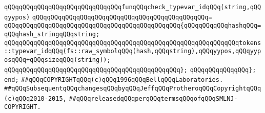 \newline
\verb|qQQqqQQqqQQqqQQqqQQqqQQqqQQqqQQqfunqQQqcheck_typevar_idqQQq(string,qQQqyypos)|\newline
\verb|qQQqqQQqqQQqqQQqqQQqqQQqqQQqqQQqqQQqqQQqqQQqqQQq=|\newline
\verb|qQQqqQQqqQQqqQQqqQQqqQQqqQQqqQQqqQQqqQQqqQQqqQQq{qQQqqQQqqQQqhashqQQq=qQQqhash_stringqQQqstring;|\newline
\newline
\verb|qQQqqQQqqQQqqQQqqQQqqQQqqQQqqQQqqQQqqQQqqQQqqQQqqQQqqQQqqQQqqQQqtokens::typevar_idqQQq(fs::raw_symbolqQQq(hash,qQQqstring),qQQqyypos,qQQqyyposqQQq+qQQqsizeqQQq(string));|\newline
\verb|qQQqqQQqqQQqqQQqqQQqqQQqqQQqqQQqqQQqqQQqqQQqqQQq};|\newline
\newline
\verb|qQQqqQQqqQQqqQQq};|\newline
\verb|end;|\newline
\newline
\verb|##qQQqCOPYRIGHTqQQq(c)qQQq1996qQQqBellqQQqLaboratories.|\newline
\verb|##qQQqSubsequentqQQqchangesqQQqbyqQQqJeffqQQqProtheroqQQqCopyrightqQQq(c)qQQq2010-2015,|\newline
\verb|##qQQqreleasedqQQqperqQQqtermsqQQqofqQQqSMLNJ-COPYRIGHT.|\newline

